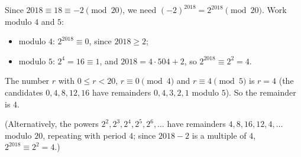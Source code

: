 Since $2018\equiv18\equiv-2\pmod{20}$, we need $(-2)^{2018}=2^{2018}\pmod{20}$. Work modulo $4$ and $5$:
\begin{itemize}
\item modulo $4$: $2^{2018}\equiv0$, since $2018\ge2$;
\item modulo $5$: $2^4=16\equiv1$, and $2018=4\cdot504+2$, so $2^{2018}\equiv2^2=4$.
\end{itemize}
The number $r$ with $0\le r<20$, $r\equiv0\pmod4$ and $r\equiv4\pmod5$ is $r=4$ (the candidates $0,4,8,12,16$ have remainders $0,4,3,2,1$ modulo $5$). So the remainder is $\boxed{4}$.

(Alternatively, the powers $2^2,2^3,2^4,2^5,2^6,\dots$ have remainders $4,8,16,12,4,\dots$ modulo $20$, repeating with period $4$; since $2018-2$ is a multiple of $4$, $2^{2018}\equiv2^2=4$.)
